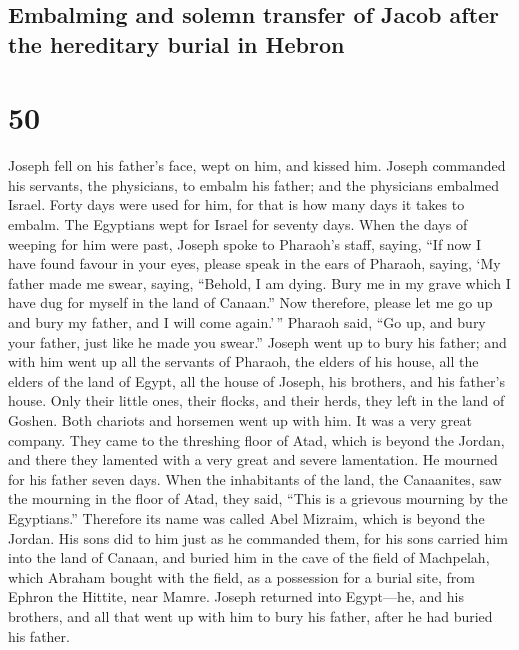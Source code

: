 \hypertarget{embalming-and-solemn-transfer-of-jacob-after-the-hereditary-burial-in-hebron}{%
\subsection{Embalming and solemn transfer of Jacob after the hereditary
burial in
Hebron}\label{embalming-and-solemn-transfer-of-jacob-after-the-hereditary-burial-in-hebron}}

\hypertarget{section-49}{%
\section{50}\label{section-49}}

 Joseph fell on his father's face, wept on him, and kissed
him.  Joseph commanded his servants, the physicians, to
embalm his father; and the physicians embalmed Israel. 
Forty days were used for him, for that is how many days it takes to
embalm. The Egyptians wept for Israel for seventy days. 
When the days of weeping for him were past, Joseph spoke to Pharaoh's
staff, saying, ``If now I have found favour in your eyes, please speak
in the ears of Pharaoh, saying,  `My father made me swear,
saying, ``Behold, I am dying. Bury me in my grave which I have dug for
myself in the land of Canaan.'' Now therefore, please let me go up and
bury my father, and I will come again.'\,''  Pharaoh said,
``Go up, and bury your father, just like he made you swear.''
 Joseph went up to bury his father; and with him went up
all the servants of Pharaoh, the elders of his house, all the elders of
the land of Egypt,  all the house of Joseph, his brothers,
and his father's house. Only their little ones, their flocks, and their
herds, they left in the land of Goshen.  Both chariots and
horsemen went up with him. It was a very great company. 
They came to the threshing floor of Atad, which is beyond the Jordan,
and there they lamented with a very great and severe lamentation. He
mourned for his father seven days.  When the inhabitants
of the land, the Canaanites, saw the mourning in the floor of Atad, they
said, ``This is a grievous mourning by the Egyptians.'' Therefore its
name was called Abel Mizraim, which is beyond the Jordan.
 His sons did to him just as he commanded them,
 for his sons carried him into the land of Canaan, and
buried him in the cave of the field of Machpelah, which Abraham bought
with the field, as a possession for a burial site, from Ephron the
Hittite, near Mamre.  Joseph returned into Egypt---he,
and his brothers, and all that went up with him to bury his father,
after he had buried his father.

